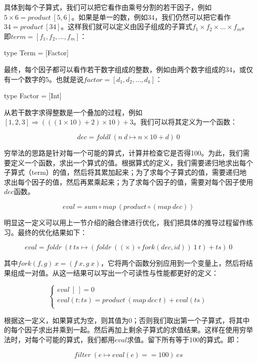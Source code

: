 \documentclass[b5paper]{ctexart}
\begin{document}
具体到每个子算式，我们可以把它看作由乘号分割的若干因子，例如$5 \times 6 = product\ [5, 6]$。如果是单一的数，例如$34$，我们仍然可以把它看作$34 = product\ [34]$。这样我们就可以定义由因子组成的子算式$f_1 \times f_2 \times ... \times f_m$。即$term = [f_1, f_2, ..., f_m]$：

\begin{Haskell}
type Term = [Factor]
\end{Haskell}

最终，每个因子都可以看作若干数字组成的整数，例如由两个数字组成的34，或仅有一个数字的5。也就是说$\textit{factor} = [d_1, d_2, ..., d_k]$：

\begin{Haskell}
type Factor = [Int]
\end{Haskell}

从若干数字求得整数是一个叠加的过程，例如$[1, 2, 3] \Rightarrow (((1 \times 10) + 2) \times 10) + 3$。我们可以将其定义为一个函数：

\[
dec = foldl\ (n\ d \mapsto n \times 10 + d)\ 0
\]

穷举法的思路是针对每一个可能的算式，计算并检查它是否得100。为此，我们需要定义一个函数，求出一个算式的值。根据算式的定义，我们需要递归地求出每个子算式（term）的值，然后将其累加起来；为了求每个子算式的值，需要递归地求出每个因子的值，然后再累乘起来；为了求每个因子的值，需要对每个因子使用$dec$函数。

\[
eval = sum \circ map\ (product \circ (map\ dec))
\]

明显这一定义可以用上一节介绍的融合律进行优化，我们把具体的推导过程留作练习。最终的优化结果如下：

\[
eval = foldr\ (t\ ts \mapsto (foldr\ ((\times) \circ fork(dec, id))\ 1\ t) + ts)\ 0
\]

其中$fork(f, g)\ x = (f\ x, g\ x)$，它将两个函数分别应用到一个变量上，然后将结果组成一对值。从这一结果可以写出一个可读性与性能都更好的定义：

\[
\begin{cases}
eval\ [\ ] = 0 \\
eval (t:ts) = product\ (map\ dec\ t) + eval(ts) \\
\end{cases}
\]

根据这一定义，如果算式为空，则其值为0；否则我们取出第一个子算式，将其中的每个因子求出并乘到一起。然后再加上剩余子算式的求值结果。这样在使用穷举法时，对每个可能的算式，我们都用$eval$求值。留下所有等于100的算式。即：

\[
filter\ (e \mapsto eval(e) == 100)\ es
\]
\end{document}

